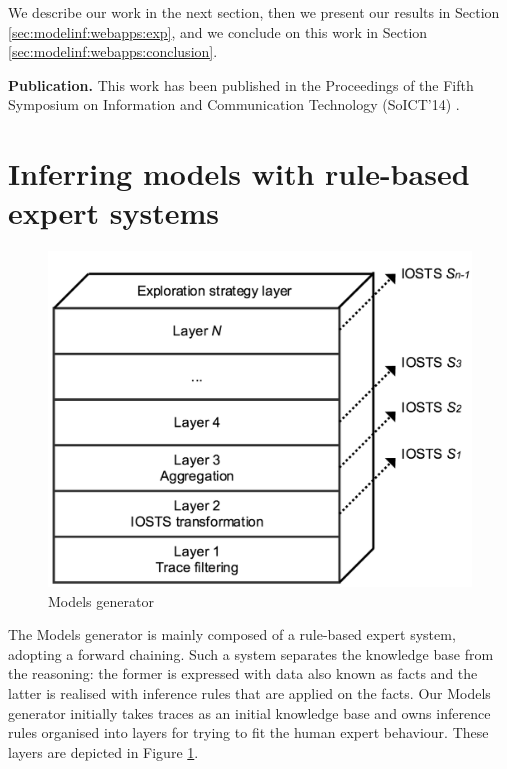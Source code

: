 We describe our work in the next section, then we present our
results in Section \ref{sec:modelinf:webapps:exp}, and we
conclude on this work in Section
\ref{sec:modelinf:webapps:conclusion}.

\textbf{Publication.} This work has been published in the
Proceedings of the Fifth Symposium on Information and
Communication Technology (SoICT'14)
\cite{DBLP:conf/soict/DurandS14}.


\section{Inferring models with rule-based expert systems}
\label{sec:modelinf:webapps:contrib}

\begin{figure}[ht]
    \begin{center}
        \includegraphics[width=1.0\linewidth]{figures/soict_se.png}
    \end{center}
    \caption {Models generator}

    \label{fig:se}
\end{figure}

The Models generator is mainly composed of a rule-based expert
system, adopting a forward chaining. Such a system separates the
knowledge base from the reasoning: the former is expressed with
data also known as facts and the latter is realised with
inference rules that are applied on the facts. Our Models
generator initially takes traces as an initial knowledge base and
owns inference rules organised into layers for trying to fit the
human expert behaviour. These layers are depicted in Figure
\ref{fig:se}.

